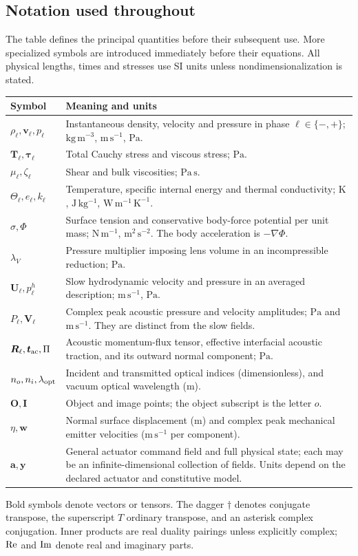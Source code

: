\subsection{Notation used throughout}
The table defines the principal quantities before their subsequent use. More
specialized symbols are introduced immediately before their equations. All
physical lengths, times and stresses use SI units unless nondimensionalization
is stated.
\begin{longtable}{@{}p{29mm}p{112mm}@{}}
\toprule Symbol & Meaning and units \\\midrule\endhead
$\rho_\ell,\bm v_\ell,p_\ell$ & Instantaneous density, velocity and pressure in
phase $\ell\in\{-,+\}$; $\mathrm{kg\,m^{-3}}$, $\mathrm{m\,s^{-1}}$, $\mathrm{Pa}$.\\
$\bm T_\ell,\bm\tau_\ell$ & Total Cauchy stress and viscous stress; $\mathrm{Pa}$.\\
$\mu_\ell,\zeta_\ell$ & Shear and bulk viscosities; $\mathrm{Pa\,s}$.\\
$\Theta_\ell,e_\ell,k_\ell$ & Temperature, specific internal energy and thermal
conductivity; $\mathrm K$, $\mathrm{J\,kg^{-1}}$, $\mathrm{W\,m^{-1}\,K^{-1}}$.\\
$\sigma,\Phi$ & Surface tension and conservative body-force potential per unit
mass; $\mathrm{N\,m^{-1}}$, $\mathrm{m^2\,s^{-2}}$. The body acceleration is $-\nabla\Phi$.\\
$\lambda_V$ & Pressure multiplier imposing lens volume in an incompressible
reduction; $\mathrm{Pa}$.\\
$\bm U_\ell,p^h_\ell$ & Slow hydrodynamic velocity and pressure in an averaged
description; $\mathrm{m\,s^{-1}}$, $\mathrm{Pa}$.\\
$P_\ell,\bm V_\ell$ & Complex peak acoustic pressure and velocity amplitudes;
$\mathrm{Pa}$ and $\mathrm{m\,s^{-1}}$. They are distinct from the slow fields.\\
$\bm R_\ell,\bm t_{\rm ac},\Pi$ & Acoustic momentum-flux tensor, effective
interfacial acoustic traction, and its outward normal component; $\mathrm{Pa}$.\\
$n_o,n_i,\lambda_{\rm opt}$ & Incident and transmitted optical indices
(dimensionless), and vacuum optical wavelength ($\mathrm m$).\\
$\bm O,\bm I$ & Object and image points; the object subscript is the letter $o$.\\
$\eta,\bm w$ & Normal surface displacement ($\mathrm m$) and complex peak
mechanical emitter velocities ($\mathrm{m\,s^{-1}}$ per component).\\
$\bm a,\bm y$ & General actuator command field and full physical state; each
may be an infinite-dimensional collection of fields. Units depend on the
declared actuator and constitutive model.\\
\bottomrule
\end{longtable}
Bold symbols denote vectors or tensors. The dagger $\dagger$ denotes conjugate
transpose, the superscript $T$ ordinary transpose, and an asterisk complex
conjugation. Inner products are real duality pairings unless explicitly complex;
$\operatorname{Re}$ and $\operatorname{Im}$ denote real and imaginary parts.
